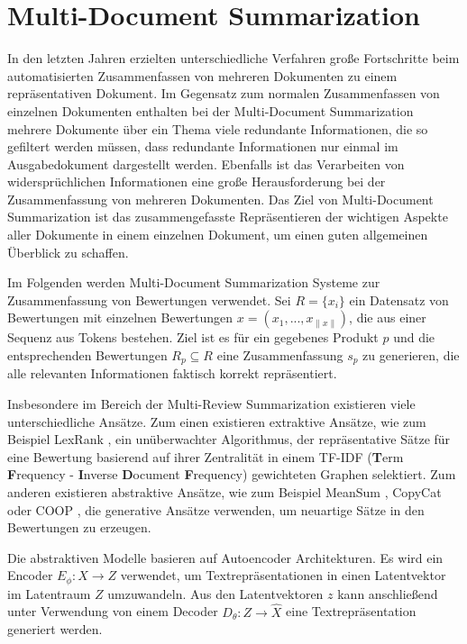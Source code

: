 \section{Multi-Document Summarization}
\label{multisum}
In den letzten Jahren erzielten unterschiedliche Verfahren große Fortschritte beim automatisierten Zusammenfassen von mehreren Dokumenten zu einem repräsentativen Dokument.
Im Gegensatz zum normalen Zusammenfassen von einzelnen Dokumenten enthalten bei der Multi-Document Summarization mehrere Dokumente über ein Thema viele redundante Informationen, die so gefiltert werden müssen, dass redundante Informationen nur einmal im Ausgabedokument dargestellt werden.
Ebenfalls ist das Verarbeiten von widersprüchlichen Informationen eine große Herausforderung bei der Zusammenfassung von mehreren Dokumenten.
Das Ziel von Multi-Document Summarization ist das zusammengefasste Repräsentieren der wichtigen Aspekte aller Dokumente in einem einzelnen Dokument, um einen guten allgemeinen Überblick zu schaffen.

Im Folgenden werden Multi-Document Summarization Systeme zur Zusammenfassung von Bewertungen verwendet.
Sei $R= \{x_i \}$ ein Datensatz von Bewertungen mit einzelnen Bewertungen $x=(x_1,...,x_{\| x \|})$, die aus einer Sequenz aus Tokens bestehen.
Ziel ist es für ein gegebenes Produkt $p$ und die entsprechenden Bewertungen $R_p \subseteq R$ eine Zusammenfassung $s_p$ zu generieren, die alle relevanten Informationen faktisch korrekt repräsentiert.


Insbesondere im Bereich der Multi-Review Summarization existieren viele unterschiedliche Ansätze.
Zum einen existieren extraktive Ansätze, wie zum Beispiel LexRank \citep{lexrank}, ein unüberwachter Algorithmus, der repräsentative Sätze für eine Bewertung basierend auf ihrer Zentralität in einem TF-IDF (\textbf{T}erm \textbf{F}requency - \textbf{I}nverse \textbf{D}ocument \textbf{F}requency) \citep{tfidf} gewichteten Graphen selektiert.
Zum anderen existieren abstraktive Ansätze, wie zum Beispiel MeanSum \citep{meansum}, CopyCat \citep{copycat} oder COOP \citep{coop}, die generative Ansätze verwenden, um neuartige Sätze in den Bewertungen zu erzeugen.

Die abstraktiven Modelle basieren auf Autoencoder Architekturen. Es wird ein Encoder $E_\phi : X \rightarrow Z$ verwendet, um Textrepräsentationen in einen Latentvektor im Latentraum $Z$ umzuwandeln.
Aus den Latentvektoren $z$ kann anschließend unter Verwendung von einem Decoder $D_\theta : Z \rightarrow \hat{X}$ eine Textrepräsentation generiert werden.


